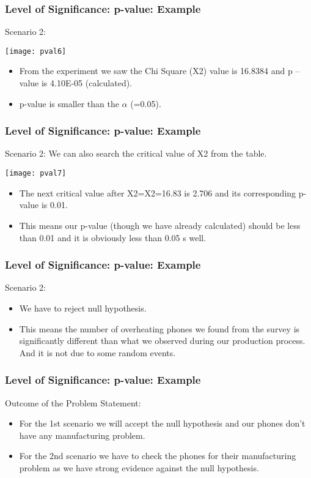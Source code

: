 \begin{frame}[fragile]\frametitle{Level of Significance: p-value: Example}
Scenario 2:

\begin{center}
\texttt{[image: pval6]}
\end{center}

\begin{itemize}
\item From the experiment we saw the Chi Square (X2) value is 16.8384 and p –value is 4.10E-05 (calculated).
\item  p-value is smaller than the $\alpha$ (=0.05).
\end{itemize}
\end{frame}

\begin{frame}[fragile]\frametitle{Level of Significance: p-value: Example}
Scenario 2:
We can also search the critical value of X2 from the table. 
\begin{center}
\texttt{[image: pval7]}
\end{center}

\begin{itemize}
\item The next critical value after X2=X2=16.83 is 2.706 and its corresponding p-value is 0.01. 
\item This means our p-value (though we have already calculated) should be less than 0.01 and it is obviously less than 0.05 s well.
\end{itemize}
\end{frame}

\begin{frame}[fragile]\frametitle{Level of Significance: p-value: Example}
Scenario 2:
\begin{itemize}
\item We have to reject null hypothesis. 
\item This means the number of overheating phones we found from the survey is significantly different than what we observed during our production process. And it is not due to some random events.
\end{itemize}
\end{frame}

\begin{frame}[fragile]\frametitle{Level of Significance: p-value: Example}
Outcome of the Problem Statement:
\begin{itemize}
\item For the 1st scenario we will accept the null hypothesis and our phones don’t have any manufacturing problem.
\item For the 2nd scenario we have to check the phones for their manufacturing problem as we have strong evidence against the null hypothesis.
\end{itemize}
\end{frame}


